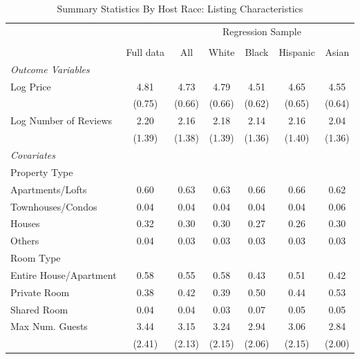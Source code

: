 \begin{table}[htbp]
\caption{Summary Statistics By Host Race: Listing Characteristics}
\begin{center}%
\small\begin{tabular}{l c | c | c c c c}
& \multicolumn{1}{c}{} & \multicolumn{5}{c}{Regression Sample}
\\
 \cmidrule(r){3-7}
\\
 & \multicolumn{1}{c}{Full data} & \multicolumn{1}{c}{All} & White & Black & Hispanic & Asian
\\
\hline\hline\noalign{\smallskip} 
 \textit{\textit{Outcome Variables}} & & & & & & \\ Log Price & 4.81 & 4.73 & 4.79 & 4.51 & 4.65 & 4.55 \\
 & (0.75) & (0.66) & (0.66) & (0.62) & (0.65) & (0.64) \\
 Log Number of Reviews & 2.20 & 2.16 & 2.18 & 2.14 & 2.16 & 2.04 \\
 & (1.39) & (1.38) & (1.39) & (1.36) & (1.40) & (1.36) \\
 \textit{Covariates} & & & & & & \\ \hline Property Type & & & & & & \\ \hspace{10bp}Apartments/Lofts    & 0.60 & 0.63 & 0.63 & 0.66 & 0.66 & 0.62 \\ \hspace{10bp}Townhouses/Condos   & 0.04 & 0.04 & 0.04 & 0.04 & 0.04 & 0.06 \\ \hspace{10bp}Houses                      & 0.32 & 0.30 & 0.30 & 0.27 & 0.26 & 0.30 \\ \hspace{10bp}Others                              & 0.04 & 0.03 & 0.03 & 0.03 & 0.03 & 0.03 \\Room Type &&&&&& \\ \hspace{10bp}Entire House/Apartment      & 0.58 & 0.55 & 0.58 & 0.43 & 0.51 & 0.42 \\ \hspace{10bp}Private Room                        & 0.38 & 0.42 & 0.39 & 0.50 & 0.44 & 0.53 \\ \hspace{10bp}Shared Room                         & 0.04 & 0.04 & 0.03 & 0.07 & 0.05 & 0.05 \\ Max Num. Guests & 3.44 & 3.15 & 3.24 & 2.94 & 3.06 & 2.84 \\
 & (2.41) & (2.13) & (2.15) & (2.06) & (2.15) & (2.00) \\

\end{tabular}
\end{center}
\end{table}
